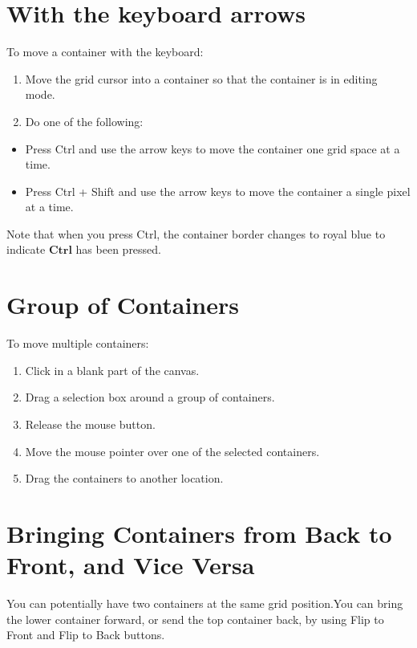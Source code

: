 \section{With the keyboard arrows}
To move a container with the keyboard:

\begin{enumerate}
  \item Move the grid cursor into a container so that the container is in editing mode.

  \item Do one of the following:

\end{enumerate}

\begin{itemize}
  \item Press Ctrl and use the arrow keys to move the container one grid space at a time.

  \item Press Ctrl + Shift and use the arrow keys to move the container a single pixel at a time.

\end{itemize}

Note that when you press Ctrl, the container border changes to royal blue to indicate $\mathbf{C t r l}$ has been pressed.

\section{Group of Containers}
To move multiple containers:

\begin{enumerate}
  \item Click in a blank part of the canvas.

  \item Drag a selection box around a group of containers.

  \item Release the mouse button.

  \item Move the mouse pointer over one of the selected containers.

  \item Drag the containers to another location.

\end{enumerate}

\section{Bringing Containers from Back to Front, and Vice Versa}
You can potentially have two containers at the same grid position.You can bring the lower container forward, or send the top container back, by using Flip to Front and Flip to Back buttons.

